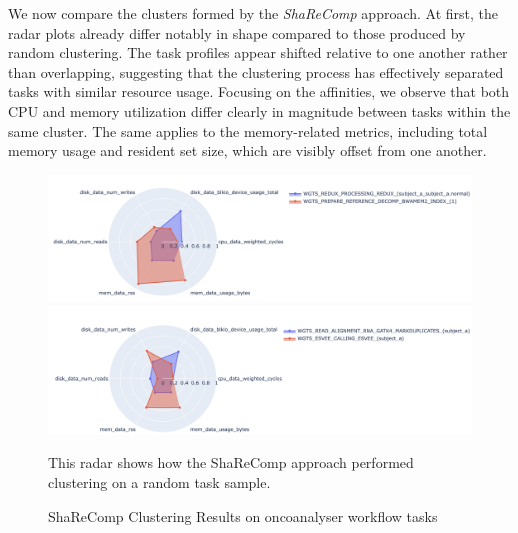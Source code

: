 We now compare the clusters formed by the \textit{ShaReComp} approach. At first, the radar plots already differ notably in shape compared to those produced by random clustering. The task profiles appear shifted relative to one another rather than overlapping, suggesting that the clustering process has effectively separated tasks with similar resource usage. Focusing on the affinities, we observe that both CPU and memory utilization differ clearly in magnitude between tasks within the same cluster. The same applies to the memory-related metrics, including total memory usage and resident set size, which are visibly offset from one another.

\begin{figure}[H]
    \centering
    \includegraphics[scale=0.45]{fig/06/06-radarplot-cluster.png}
    \includegraphics[scale=0.45]{fig/06/06-radarplot-cluster-2.png}
    \small
    \caption{ShaReComp Clustering Results on oncoanalyser workflow tasks}
    \label{fig:radarplot_cluster}
    \tiny
    This radar shows how the ShaReComp approach performed clustering on a random task sample.
\end{figure}

